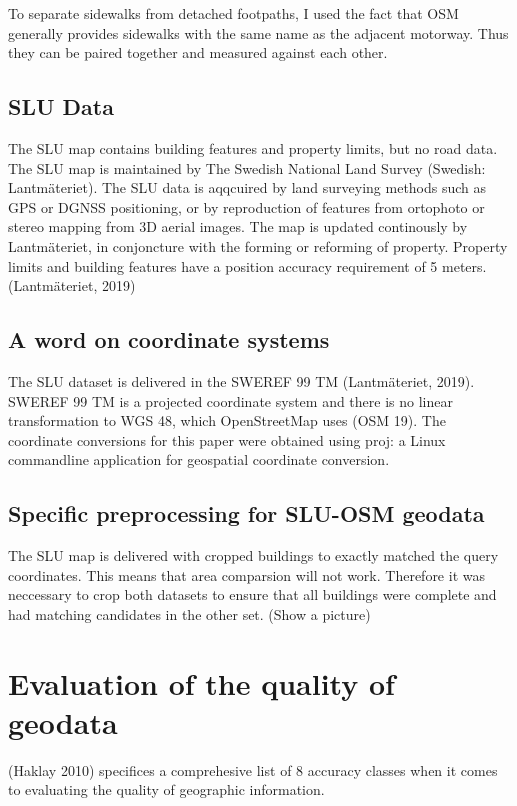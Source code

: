 \documentclass[a4paper]{article}
\begin{document}
To separate sidewalks from detached footpaths, I used the fact that OSM generally provides sidewalks with the same name as the adjacent motorway. Thus they can be paired together and measured against each other.

\subsection{SLU Data}

The SLU map contains building features and property limits, but no road data.
The SLU map is maintained by The Swedish National Land Survey (Swedish: Lantmäteriet).
The SLU data is aqqcuired by land surveying methods such as GPS or DGNSS positioning, or by reproduction of features from ortophoto or stereo mapping from 3D aerial images.
The map is updated continously by Lantmäteriet, in conjoncture with the forming or reforming of property.
Property limits and building features have a position accuracy requirement of 5 meters.
(Lantmäteriet, 2019)

\subsection{A word on coordinate systems}

The SLU dataset is delivered in the SWEREF 99 TM (Lantmäteriet, 2019). SWEREF 99 TM is a projected coordinate system and there is no linear transformation to WGS 48, which OpenStreetMap uses (OSM 19). The coordinate conversions for this paper were obtained using proj: a Linux commandline application for geospatial coordinate conversion.

\subsection{Specific preprocessing for SLU-OSM geodata}

The SLU map is delivered with cropped buildings to exactly matched the query coordinates. This means that area comparsion will not work.
Therefore it was neccessary to crop both datasets to ensure that all buildings were complete and had matching candidates in the other set.
(Show a picture)

\section{Evaluation of the quality of geodata}

(Haklay 2010) specifices a comprehesive list of 8 accuracy classes when it comes to evaluating the quality of geographic information.
\end{document}
